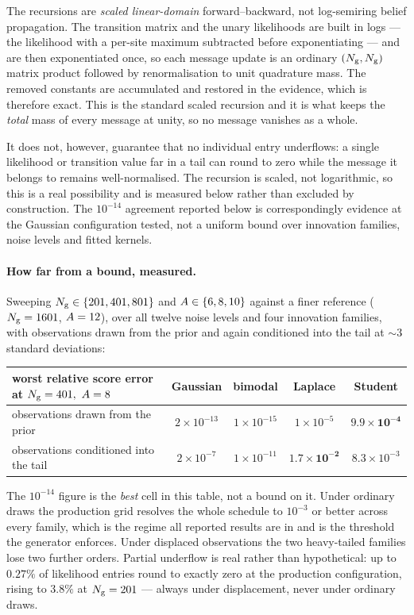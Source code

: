 The recursions are \emph{scaled linear-domain} forward--backward, not log-semiring belief
propagation. The transition matrix and the unary likelihoods are built in logs --- the likelihood
with a per-site maximum subtracted before exponentiating --- and are then exponentiated once, so
each message update is an ordinary $(N_{\mathrm{g}},N_{\mathrm{g}})$ matrix product followed by renormalisation to
unit quadrature mass. The removed constants are accumulated and restored in the evidence, which is
therefore exact. This is the standard scaled recursion and it is what keeps the \emph{total} mass
of every message at unity, so no message vanishes as a whole.

It does not, however, guarantee that no individual entry underflows: a single likelihood or
transition value far in a tail can round to zero while the message it belongs to remains
well-normalised. The recursion is scaled, not logarithmic, so this is a real possibility and is
measured below rather than excluded by construction. The $10^{-14}$ agreement reported below is
correspondingly evidence at the Gaussian configuration tested, not a uniform bound over innovation
families, noise levels and fitted kernels.

\paragraph{How far from a bound, measured.} Sweeping $N_{\mathrm{g}}\in\{201,401,801\}$ and
$A\in\{6,8,10\}$ against a finer reference ($N_{\mathrm{g}}=1601$, $A=12$), over all
twelve noise levels and four innovation families, with observations drawn from the prior and again
conditioned into the tail at ${\sim}3$ standard deviations:

\begin{center}\small
\begin{tabular}{@{}lcccc@{}}
\toprule
worst relative score error at $N_{\mathrm{g}}=401,\ A=8$
  & Gaussian & bimodal & Laplace & Student \\
\midrule
observations drawn from the prior & $2\times10^{-13}$ & $1\times10^{-15}$
  & $1\times10^{-5}$ & $\mathbf{9.9\times10^{-4}}$ \\
observations conditioned into the tail & $2\times10^{-7}$ & $1\times10^{-11}$
  & $\mathbf{1.7\times10^{-2}}$ & $8.3\times10^{-3}$ \\
\bottomrule
\end{tabular}
\end{center}

\noindent The $10^{-14}$ figure is the \emph{best} cell in this table, not a bound on it. Under
ordinary draws the production grid resolves the whole schedule to $10^{-3}$ or better across every
family, which is the regime all reported results are in and is the threshold the generator
enforces. Under displaced observations the two heavy-tailed families lose two further orders.
Partial underflow is real rather than hypothetical: up to $0.27\%$ of likelihood entries round to
exactly zero at the production configuration, rising to $3.8\%$ at $N_{\mathrm{g}}=201$ --- always under
displacement, never under ordinary draws.

